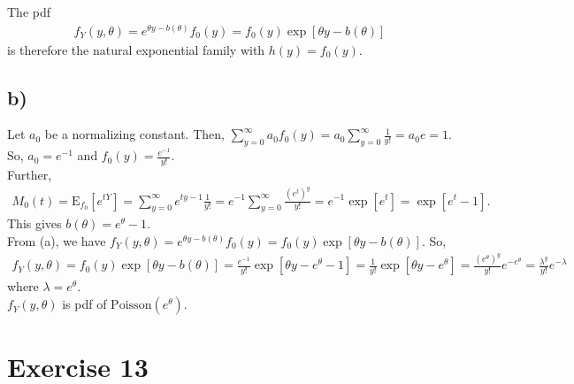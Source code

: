 \documentclass[a4paper]{article}
\newcommand{\E}{\mathrm{E}}
\begin{document}
The pdf 
\begin{align*}
f_{Y}(y,\theta) = e^{\theta y - b(\theta)}f_{0}(y) = f_{0}(y)\exp\left[\theta y -b(\theta)\right]
\end{align*}
is therefore the natural exponential family with $h(y) = f_{0}(y)$.


\subsection{b)}
Let $a_{0}$ be a normalizing constant. Then, $\sum_{y=0}^{\infty} a_{0} f_{0}(y) = a_{0}\sum_{y=0}^{\infty} \frac{1}{y!} = a_{0} e = 1$. So, $a_{0} = e^{-1}$ and $f_{0}(y) = \frac{e^{-1}}{y!}$.\\
Further, 
\begin{align*}
M_{0}(t) = \E_{f_{0}}\left[e^{t Y}\right] = \sum_{y=0}^{\infty}e^{t y -1}\frac{1}{y!} = e^{-1}\sum_{y=0}^{\infty}\frac{(e^{t})^{y}}{y!} = e^{-1}\exp\left[e^{t}\right] = \exp\left[e^{t} -1\right].
\end{align*}
This gives $b(\theta) = e^{\theta}-1$.\\
From (a), we have $f_{Y}(y,\theta) = e^{\theta y - b(\theta)}f_{0}(y) = f_{0}(y)\exp\left[\theta y -b(\theta)\right]$. So,
\begin{align*}
f_{Y}(y,\theta) = f_{0}(y)\exp\left[\theta y -b(\theta)\right] = \frac{e^{-1}}{y!}\exp\left[\theta y -e^{\theta}-1\right] = \frac{1}{y!}\exp\left[\theta y -e^{\theta}\right] = \frac{\left(e^{\theta}\right)^{y} }{y!}e^{-e^{\theta}} = \frac{\lambda^{y}}{y!}e^{-\lambda}
\end{align*}
where $\lambda = e^{\theta}$.\\
$f_{Y}(y,\theta)$ is pdf of $\mathrm{Poisson}(e^{\theta})$. 


\vspace{\baselineskip}
\section{Exercise 13}
\end{document}
